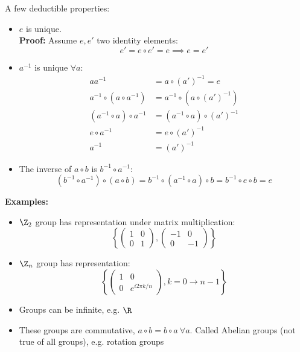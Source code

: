 \documentclass[cplx.tex]{subfiles}
\begin{document}
A few deductible properties:
\begin{itemize}
    \item $e$ is unique. \\
        \textbf{Proof:} Assume $e,e'$ two identity elements:
        \begin{equation}
            e' = e\circ e' = e \implies e = e'
        \end{equation}
    \item $a^{-1}$ is unique $\forall a$:
        \begin{align}
            aa^{-1} &= a\circ(a')^{-1} = e \\
            a^{-1}\circ (a\circ a^{-1}) &= a^{-1}\circ(a\circ(a')^{-1}) \\
            (a^{-1}\circ a)\circ a^{-1} &= (a^{-1}\circ a)\circ (a')^{-1} \\
            e\circ a^{-1} &= e\circ(a')^{-1} \\
            a^{-1} &= (a')^{-1}
        \end{align}
    \item The inverse of $a\circ b$ is $b^{-1}\circ a^{-1}$:
        \begin{equation}
            (b^{-1}\circ a^{-1})\circ (a\circ b) = b^{-1}\circ(a^{-1}\circ a)\circ b = b^{-1}\circ e\circ b = e
        \end{equation}
\end{itemize}

\textbf{Examples:}
\begin{itemize}
    \item $\Z_2$ group has representation under matrix multiplication:
        \begin{equation}
            \left\{ \begin{pmatrix} 1 & 0 \\ 0 & 1 \end{pmatrix},\begin{pmatrix} -1 & 0 \\ 0 & -1\end{pmatrix}\right\}
        \end{equation}
    \item $\Z_n$ group has representation:
        \begin{equation}
            \left\{ \begin{pmatrix} 1 & 0 \\ 0 & e^{i2\pi k/n}\end{pmatrix}, k = 0 \to n-1 \right\}
        \end{equation}
    \item Groups can be infinite, e.g. $\R$
    \item These groups are commutative, $a\circ b = b\circ a~\forall a$. 
        Called Abelian groups (not true of all groups), e.g. rotation groups
\end{itemize}
\end{document}
